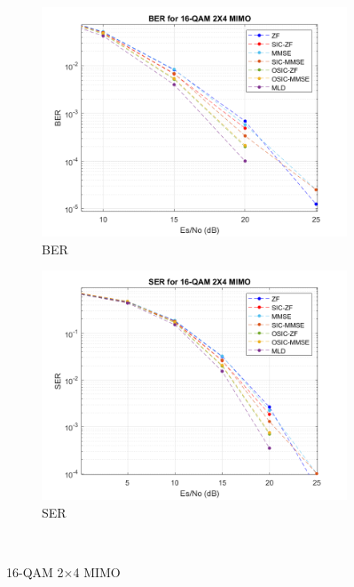 \documentclass{article}
\begin{document}
\begin{figure}[H]
	\centering
	\begin{subfigure}{0.5\textwidth}
		\centerline{\includegraphics[width=1\textwidth]{BER_2x4_16qam.png}}
		\caption{BER}
	\end{subfigure}%
	\begin{subfigure}{0.5\textwidth}
		\centerline{\includegraphics[width=1\textwidth]{SER_2x4_16qam.png}}
		\caption{SER}
	\end{subfigure}\\%
	\caption{16-QAM 2$\times$4 MIMO}
\end{figure}
\end{document}
